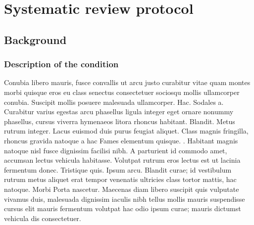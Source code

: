 

\chapter{\label{app:LTRprot} Systematic review protocol}

\minitoc

\section{Background}
\label{sec:LTRprotBackground}


	\subsection{Description of the condition}

		Conubia libero mauris, fusce convallis ut arcu justo curabitur vitae quam montes morbi quisque eros eu class senectus consectetuer sociosqu mollis ullamcorper conubia. Suscipit mollis posuere malesuada ullamcorper. Hac. Sodales a. Curabitur varius egestas arcu phasellus ligula integer eget ornare nonummy phasellus, cursus viverra hymenaeos litora rhoncus habitant. Blandit. Metus rutrum integer. Lacus euismod duis purus feugiat aliquet. Class magnis fringilla, rhoncus gravida natoque a hac Fames elementum quisque.  \citep{turk2011treatment}. Habitant magnis natoque nisl fusce dignissim facilisi nibh. A parturient id commodo amet, accumsan lectus vehicula habitasse. Volutpat rutrum eros lectus est ut lacinia fermentum donec. Tristique quis. Ipsum arcu. Blandit curae; id vestibulum rutrum metus aliquet erat tempor venenatis ultricies class tortor mattis, hac natoque. Morbi Porta nascetur. Maecenas diam libero suscipit quis vulputate vivamus duis, malesuada dignissim iaculis nibh tellus mollis mauris suspendisse cursus elit mauris fermentum volutpat hac odio ipsum curae; mauris dictumst vehicula dis consectetuer.

